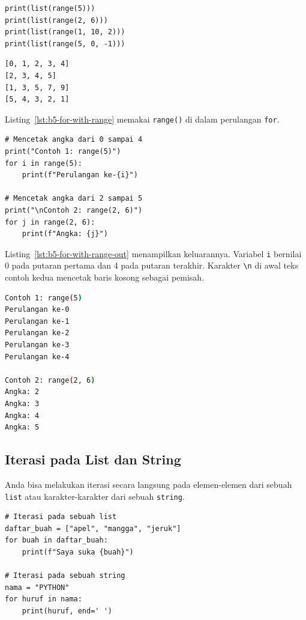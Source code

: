 \begin{lstlisting}[style=PythonStyle, caption={Kode Python: range_steps.py}, label={lst:b5-range-steps}]
print(list(range(5)))
print(list(range(2, 6)))
print(list(range(1, 10, 2)))
print(list(range(5, 0, -1)))
\end{lstlisting}

\begin{lstlisting}[language=bash, caption={Keluaran range_steps.py}, label={lst:b5-range-steps-out}]
[0, 1, 2, 3, 4]
[2, 3, 4, 5]
[1, 3, 5, 7, 9]
[5, 4, 3, 2, 1]
\end{lstlisting}

Listing~\ref{lst:b5-for-with-range} memakai \texttt{range()} di dalam perulangan \texttt{for}.

\begin{lstlisting}[style=PythonStyle, caption={Kode Python: for_with_range.py}, label={lst:b5-for-with-range}]
# Mencetak angka dari 0 sampai 4
print("Contoh 1: range(5)")
for i in range(5):
    print(f"Perulangan ke-{i}")

# Mencetak angka dari 2 sampai 5
print("\nContoh 2: range(2, 6)")
for j in range(2, 6):
    print(f"Angka: {j}")
\end{lstlisting}

Listing~\ref{lst:b5-for-with-range-out} menampilkan keluarannya. Variabel \texttt{i} bernilai 0 pada putaran pertama dan 4 pada putaran terakhir. Karakter \texttt{\textbackslash n} di awal teks contoh kedua mencetak baris kosong sebagai pemisah.

\begin{lstlisting}[language=bash, caption={Keluaran for_with_range.py}, label={lst:b5-for-with-range-out}]
Contoh 1: range(5)
Perulangan ke-0
Perulangan ke-1
Perulangan ke-2
Perulangan ke-3
Perulangan ke-4

Contoh 2: range(2, 6)
Angka: 2
Angka: 3
Angka: 4
Angka: 5
\end{lstlisting}

\subsection{Iterasi pada List dan String}
Anda bisa melakukan iterasi secara langsung pada elemen-elemen dari sebuah \texttt{list} atau karakter-karakter dari sebuah \texttt{string}.

\begin{lstlisting}[style=PythonStyle, caption={Kode Python: list_and_string_iteration.py}, label={lst:b5-list-string}]
# Iterasi pada sebuah list
daftar_buah = ["apel", "mangga", "jeruk"]
for buah in daftar_buah:
    print(f"Saya suka {buah}")

# Iterasi pada sebuah string
nama = "PYTHON"
for huruf in nama:
    print(huruf, end=' ')
\end{lstlisting}

